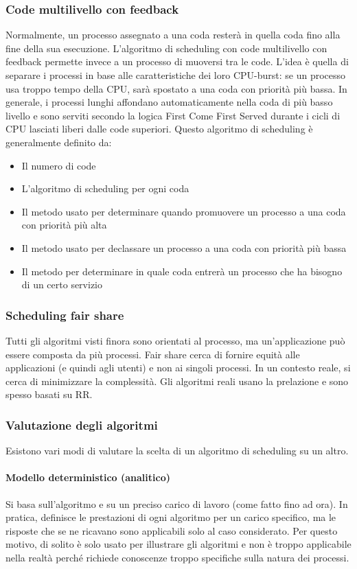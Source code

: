 \documentclass[a4paper]{article}
\begin{document}
\subsubsection{Code multilivello con feedback}
Normalmente, un processo assegnato a una coda resterà in quella coda fino alla fine della sua esecuzione. L'algoritmo di scheduling con code multilivello con feedback permette invece a un processo di muoversi tra le code. L'idea è quella di separare i processi in base alle caratteristiche dei loro CPU-burst: se un processo usa troppo tempo della CPU, sarà spostato a una coda con priorità più bassa. \newline
In generale, i processi lunghi affondano automaticamente nella coda di più basso livello e sono serviti secondo la logica First Come First Served durante i cicli di CPU lasciati liberi dalle code superiori. \newline
Questo algoritmo di scheduling è generalmente definito da:
\begin{itemize}
    \item Il numero di code
    \item L'algoritmo di scheduling per ogni coda
    \item Il metodo usato per determinare quando promuovere un processo a una coda con priorità più alta
    \item Il metodo usato per declassare un processo a una coda con priorità più bassa
    \item Il metodo per determinare in quale coda entrerà un processo che ha bisogno di un certo servizio
\end{itemize}

\subsubsection{Scheduling fair share}
Tutti gli algoritmi visti finora sono orientati al processo, ma un'applicazione può essere composta da più processi. Fair share cerca di fornire equità alle applicazioni (e quindi agli utenti) e non ai singoli processi.
In un contesto reale, si cerca di minimizzare la complessità. Gli algoritmi reali usano la prelazione e sono spesso basati su RR.

\subsubsection{Valutazione degli algoritmi}
Esistono vari modi di valutare la scelta di un algoritmo di scheduling su un altro.
\paragraph{Modello deterministico (analitico)} Si basa sull'algoritmo e su un preciso carico di lavoro (come fatto fino ad ora). In pratica, definisce le prestazioni di ogni algoritmo per un carico specifico, ma le risposte che se ne ricavano sono applicabili solo al caso considerato. Per questo motivo, di solito è solo usato per illustrare gli algoritmi e non è troppo applicabile nella realtà perché richiede conoscenze troppo specifiche sulla natura dei processi.
\end{document}
